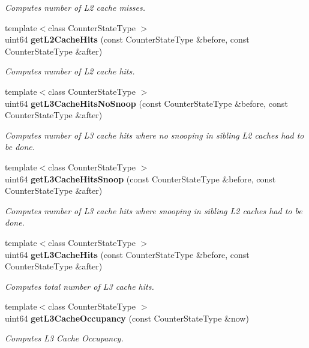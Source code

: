 \begin{DoxyCompactItemize}
\begin{DoxyCompactList}\small\item\em Computes number of L2 cache misses. \end{DoxyCompactList}\item 
{\footnotesize template$<$class Counter\+State\+Type $>$ }\\uint64 \textbf{ get\+L2\+Cache\+Hits} (const Counter\+State\+Type \&before, const Counter\+State\+Type \&after)
\begin{DoxyCompactList}\small\item\em Computes number of L2 cache hits. \end{DoxyCompactList}\item 
{\footnotesize template$<$class Counter\+State\+Type $>$ }\\uint64 \textbf{ get\+L3\+Cache\+Hits\+No\+Snoop} (const Counter\+State\+Type \&before, const Counter\+State\+Type \&after)
\begin{DoxyCompactList}\small\item\em Computes number of L3 cache hits where no snooping in sibling L2 caches had to be done. \end{DoxyCompactList}\item 
{\footnotesize template$<$class Counter\+State\+Type $>$ }\\uint64 \textbf{ get\+L3\+Cache\+Hits\+Snoop} (const Counter\+State\+Type \&before, const Counter\+State\+Type \&after)
\begin{DoxyCompactList}\small\item\em Computes number of L3 cache hits where snooping in sibling L2 caches had to be done. \end{DoxyCompactList}\item 
{\footnotesize template$<$class Counter\+State\+Type $>$ }\\uint64 \textbf{ get\+L3\+Cache\+Hits} (const Counter\+State\+Type \&before, const Counter\+State\+Type \&after)
\begin{DoxyCompactList}\small\item\em Computes total number of L3 cache hits. \end{DoxyCompactList}\item 
{\footnotesize template$<$class Counter\+State\+Type $>$ }\\uint64 \textbf{ get\+L3\+Cache\+Occupancy} (const Counter\+State\+Type \&now)
\begin{DoxyCompactList}\small\item\em Computes L3 Cache Occupancy. \end{DoxyCompactList}\item 

\end{DoxyCompactItemize}
